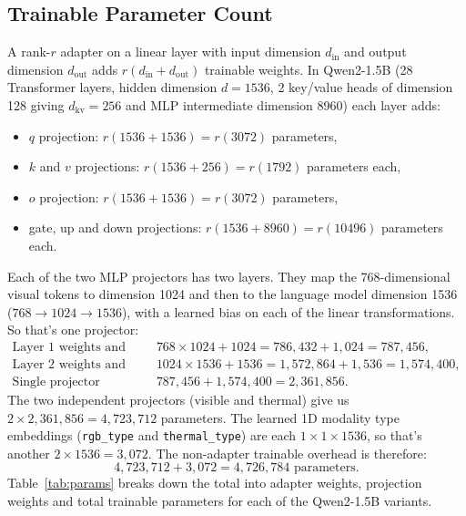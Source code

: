 \documentclass[12pt]{report}
\begin{document}
\subsection{Trainable Parameter Count}\label{sec:paramcount}
A rank-$r$ adapter on a linear layer with input dimension $d_{\text{in}}$ and output dimension $d_{\text{out}}$ adds $r(d_{\text{in}} + d_{\text{out}})$ trainable weights. In Qwen2-1.5B (28 Transformer layers, hidden dimension $d=1536$, 2 key/value heads of dimension 128 giving $d_{\text{kv}}=256$ and MLP intermediate dimension 8960) each layer adds:
\begin{itemize}[leftmargin=0.5in, itemsep=1pt]
  \item $q$ projection: $r(1536 + 1536) = r(3072)$ parameters,
  \item $k$ and $v$ projections: $r(1536 + 256) = r(1792)$ parameters each,
  \item $o$ projection: $r(1536 + 1536) = r(3072)$ parameters,
  \item gate, up and down projections: $r(1536 + 8960) = r(10496)$ parameters each.
\end{itemize}
Each of the two MLP projectors has two layers. They map the 768-dimensional visual tokens to dimension 1024 and then to the language model dimension 1536 ($768 \to 1024 \to 1536$), with a learned bias on each of the linear transformations. So that's one projector:
\begin{align}
\text{Layer 1 weights and biases:} \quad & 768 \times 1024 + 1024 = 786{,}432 + 1{,}024 = 787{,}456, \\
\text{Layer 2 weights and biases:} \quad & 1024 \times 1536 + 1536 = 1{,}572{,}864 + 1{,}536 = 1{,}574{,}400, \\
\text{Single projector subtotal:} \quad & 787{,}456 + 1{,}574{,}400 = 2{,}361{,}856.
\end{align}
The two independent projectors (visible and thermal) give us $2 \times 2{,}361{,}856 = 4{,}723{,}712$ parameters. The learned 1D modality type embeddings (\texttt{rgb\_type} and \texttt{thermal\_type}) are each $1 \times 1 \times 1536$, so that's another $2 \times 1536 = 3{,}072$. The non-adapter trainable overhead is therefore:
\begin{equation}
4{,}723{,}712 + 3{,}072 = 4{,}726{,}784 \text{ parameters}.
\end{equation}
Table~\ref{tab:params} breaks down the total into adapter weights, projection weights and total trainable parameters for each of the Qwen2-1.5B variants.

\end{document}
